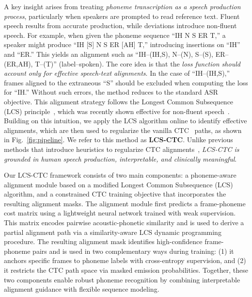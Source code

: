 A key insight arises from treating \textit{phoneme transcription as a speech production process}, particularly when speakers are prompted to read reference text. Fluent speech results from accurate production, while deviations introduce non-fluent speech. For example, when given the phoneme sequence “IH N S ER T,” a speaker might produce “IH [S] N S ER [AH] T,” introducing insertions on “IH” and “ER.” This yields an alignment such as “IH–(IH,S), N–(N), S–(S), ER–(ER,AH), T–(T)” (label–spoken). The core idea is that the \textit{loss function should account only for effective speech-text alignments}. In the case of “IH–(IH,S),” frames aligned to the extraneous “S” should be excluded when computing the loss for “IH.” Without such errors, the method reduces to the standard ASR objective. This alignment strategy follows the Longest Common Subsequence (LCS) principle~\cite{hirschberg1977algorithms-lcs1}, which was recently shown effective for non-fluent speech~\cite{ssdm}.
Building on this intuition, we apply the LCS algorithm online to identify effective alignments, which are then used to regularize the vanilla CTC~\cite{graves2006connectionist-ctc} paths, as shown in Fig.~\ref{fig:pipeline}. We refer to this method as \textbf{LCS-CTC}. Unlike previous methods that introduce heuristics to regularize CTC alignments~\cite{tian2022bayes-ctc1, huang2024less-ctc2, yao2024cr-ctc3}, \textit{LCS-CTC is grounded in human speech production, interpretable, and clinically meaningful}.

Our LCS-CTC framework consists of two main components: a phoneme-aware alignment module based on a modified Longest Common Subsequence (LCS) algorithm, and a constrained CTC training objective that incorporates the resulting alignment masks. The alignment module first predicts a frame-phoneme cost matrix using a lightweight neural network trained with weak supervision. This matrix encodes pairwise acoustic-phonetic similarity and is used to derive a partial alignment path via a similarity-aware LCS dynamic programming procedure. The resulting alignment mask identifies high-confidence frame-phoneme pairs and is used in two complementary ways during training: (1) it anchors specific frames to phoneme labels with cross-entropy supervision, and (2) it restricts the CTC path space via masked emission probabilities. Together, these two components enable robust phoneme recognition by combining interpretable alignment guidance with flexible sequence modeling.


